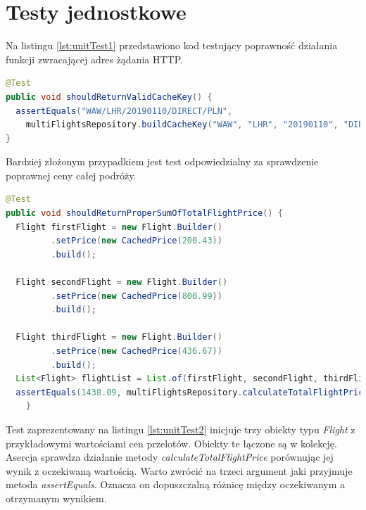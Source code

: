 \documentclass[12pt, twoside]{report}
\begin{document}
\section{Testy jednostkowe}
Na listingu \ref{lst:unitTest1} przedstawiono kod testujący poprawność działania funkcji zwracającej adres żądania HTTP.
\begin{lstlisting}[language=java, caption=Przykładowy test jednostkowy, label=lst:unitTest1]
@Test
public void shouldReturnValidCacheKey() {
  assertEquals("WAW/LHR/20190110/DIRECT/PLN",
    multiFlightsRepository.buildCacheKey("WAW", "LHR", "20190110", "DIRECT", "PLN"));
}
\end{lstlisting}
Bardziej złożonym przypadkiem jest test odpowiedzialny za sprawdzenie poprawnej ceny całej podróży.
\begin{lstlisting}[language=java, caption=Przykładowy test jednostkowy, label=lst:unitTest2]
@Test
public void shouldReturnProperSumOfTotalFlightPrice() {
  Flight firstFlight = new Flight.Builder()
         .setPrice(new CachedPrice(200.43))
         .build();
 
  Flight secondFlight = new Flight.Builder()
         .setPrice(new CachedPrice(800.99))
         .build();

  Flight thirdFlight = new Flight.Builder()
         .setPrice(new CachedPrice(436.67))
         .build();
  List<Flight> flightList = List.of(firstFlight, secondFlight, thirdFlight);
  assertEquals(1438.09, multiFlightsRepository.calculateTotalFlightPrice(flightList), 0.001);
    }
\end{lstlisting}

Test zaprezentowany na listingu \ref{lst:unitTest2} inicjuje trzy obiekty typu \textit{Flight} z przykładowymi wartościami cen przelotów. Obiekty te łączone są w kolekcję. Asercja sprawdza działanie metody \textit{calculateTotalFlightPrice} porównując jej wynik z oczekiwaną wartością. Warto zwrócić na trzeci argument jaki przyjmuje metoda \textit{assertEquals}. Oznacza on dopuszczalną różnicę między oczekiwanym a otrzymanym wynikiem.
\end{document}
